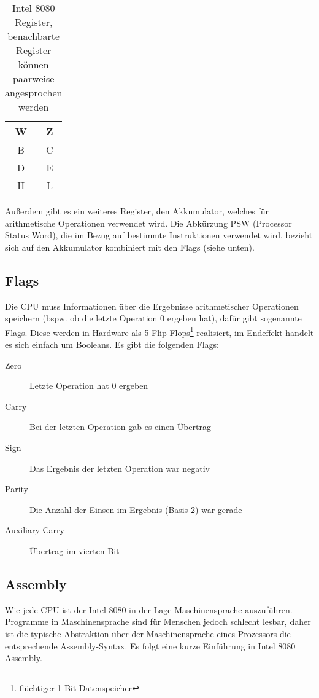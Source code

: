 \begin{table}[h]
    \centering
    \caption{Intel 8080 Register, benachbarte Register können paarweise angesprochen werden}
    \label{tab:regs}
    \begin{tabular}{|c|c|}
        \hline
        W & Z \\\hline
        B & C \\\hline
        D & E \\\hline
        H & L \\\hline
    \end{tabular}
\end{table}

Außerdem gibt es ein weiteres Register, den Akkumulator, welches für arithmetische Operationen verwendet wird.
Die Abkürzung PSW (Processor Status Word), die im Bezug auf bestimmte Instruktionen verwendet wird, bezieht sich auf den Akkumulator kombiniert mit den Flags (siehe unten).

\subsection{Flags}\label{sec:flags}

Die CPU muss Informationen über die Ergebnisse arithmetischer Operationen speichern (bspw. ob die letzte Operation 0 ergeben hat), dafür gibt sogenannte Flags. Diese werden in Hardware als 5 Flip-Flops\footnote{flüchtiger 1-Bit Datenspeicher} realisiert, im Endeffekt handelt es sich einfach um Booleans. Es gibt die folgenden Flags:

\begin{description}
    \item[Zero] Letzte Operation hat 0 ergeben
    \item[Carry] Bei der letzten Operation gab es einen Übertrag
    \item[Sign] Das Ergebnis der letzten Operation war negativ
    \item[Parity] Die Anzahl der Einsen im Ergebnis (Basis 2) war gerade
    \item[Auxiliary Carry] Übertrag im vierten Bit %
\end{description}


\subsection{Assembly}

Wie jede CPU ist der Intel 8080 in der Lage Maschinensprache auszuführen. Programme in Maschinensprache sind für Menschen jedoch schlecht lesbar, daher ist die typische Abstraktion über der Maschinensprache eines Prozessors die entsprechende Assembly-Syntax.
Es folgt eine kurze Einführung in Intel 8080 Assembly.

